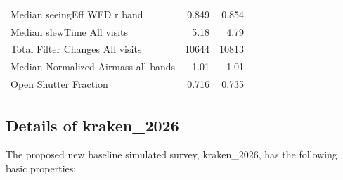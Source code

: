 \documentclass[DM,authoryear,toc]{lsstdoc}
\begin{document}
\begin{table}
\begin{tabular}{lrr}
Median seeingEff WFD r band                &           0.849  &         0.854 \\
Median slewTime All visits                 &           5.18   &         4.79 \\
Total Filter Changes All visits            &          10644   &         10813     \\
Median Normalized Airmass all bands        &          1.01    &         1.01  \\
Open Shutter Fraction                      &          0.716   &         0.735 \\
\bottomrule
\end{tabular}
\label{tab:baseline_comparison}
\end{table}

\subsection{Details of kraken\_2026}

The proposed new baseline simulated survey, kraken\_2026, has the following basic properties:
\end{document}
